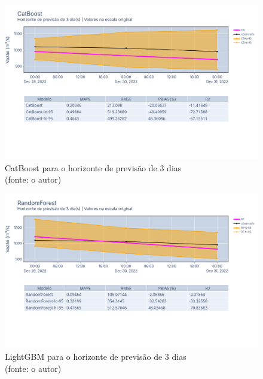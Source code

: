 \begin{figure}[!h]
	\centering
	\includegraphics[scale=0.33]{Figuras/jequiti/resultados/CatBoost_fh3.png}
	\caption{CatBoost para o horizonte de previsão de 3 dias\\(fonte: o autor)}
	\label{fig:jequiti_CatBoostRegressor_fh3}
\end{figure}

\begin{figure}[!h]
	\centering
	\includegraphics[scale=0.33]{Figuras/jequiti/resultados/RandomForest_fh3.png}
	\caption{LightGBM para o horizonte de previsão de 3 dias\\(fonte: o autor)}
	\label{fig:jequiti_LGBMRegressor_fh3}
\end{figure}

